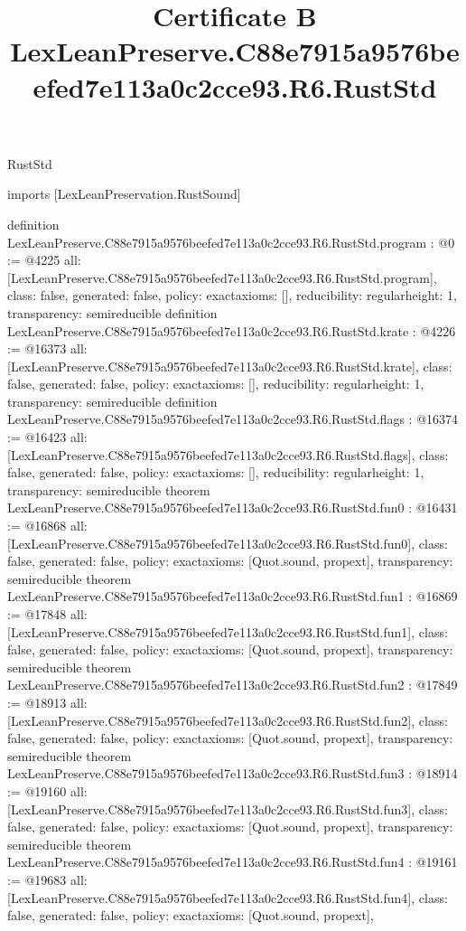 \begin{lexlean}{RustStd}
\title{Certificate B LexLeanPreserve.C88e7915a9576beefed7e113a0c2cce93.R6.RustStd}
\begin{coremodule}
imports [LexLeanPreservation.RustSound]

definition LexLeanPreserve.C88e7915a9576beefed7e113a0c2cce93.R6.RustStd.program : @0 := @4225 {
  all: [LexLeanPreserve.C88e7915a9576beefed7e113a0c2cce93.R6.RustStd.program],
  class: false,
  generated: false,
  policy: exact{axioms: []},
  reducibility: regular{height: 1},
  transparency: semireducible
}
definition LexLeanPreserve.C88e7915a9576beefed7e113a0c2cce93.R6.RustStd.krate : @4226 := @16373 {
  all: [LexLeanPreserve.C88e7915a9576beefed7e113a0c2cce93.R6.RustStd.krate],
  class: false,
  generated: false,
  policy: exact{axioms: []},
  reducibility: regular{height: 1},
  transparency: semireducible
}
definition LexLeanPreserve.C88e7915a9576beefed7e113a0c2cce93.R6.RustStd.flags : @16374 := @16423 {
  all: [LexLeanPreserve.C88e7915a9576beefed7e113a0c2cce93.R6.RustStd.flags],
  class: false,
  generated: false,
  policy: exact{axioms: []},
  reducibility: regular{height: 1},
  transparency: semireducible
}
theorem LexLeanPreserve.C88e7915a9576beefed7e113a0c2cce93.R6.RustStd.fun0 : @16431 := @16868 {
  all: [LexLeanPreserve.C88e7915a9576beefed7e113a0c2cce93.R6.RustStd.fun0],
  class: false,
  generated: false,
  policy: exact{axioms: [Quot.sound, propext]},
  transparency: semireducible
}
theorem LexLeanPreserve.C88e7915a9576beefed7e113a0c2cce93.R6.RustStd.fun1 : @16869 := @17848 {
  all: [LexLeanPreserve.C88e7915a9576beefed7e113a0c2cce93.R6.RustStd.fun1],
  class: false,
  generated: false,
  policy: exact{axioms: [Quot.sound, propext]},
  transparency: semireducible
}
theorem LexLeanPreserve.C88e7915a9576beefed7e113a0c2cce93.R6.RustStd.fun2 : @17849 := @18913 {
  all: [LexLeanPreserve.C88e7915a9576beefed7e113a0c2cce93.R6.RustStd.fun2],
  class: false,
  generated: false,
  policy: exact{axioms: [Quot.sound, propext]},
  transparency: semireducible
}
theorem LexLeanPreserve.C88e7915a9576beefed7e113a0c2cce93.R6.RustStd.fun3 : @18914 := @19160 {
  all: [LexLeanPreserve.C88e7915a9576beefed7e113a0c2cce93.R6.RustStd.fun3],
  class: false,
  generated: false,
  policy: exact{axioms: [Quot.sound, propext]},
  transparency: semireducible
}
theorem LexLeanPreserve.C88e7915a9576beefed7e113a0c2cce93.R6.RustStd.fun4 : @19161 := @19683 {
  all: [LexLeanPreserve.C88e7915a9576beefed7e113a0c2cce93.R6.RustStd.fun4],
  class: false,
  generated: false,
  policy: exact{axioms: [Quot.sound, propext]},
}
\end{coremodule}
\end{lexlean}
